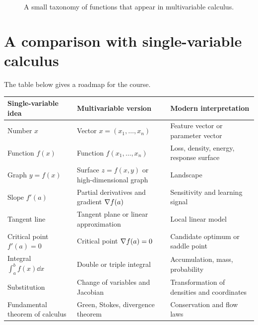 \begin{figure}[H]
\centering
{}
\caption{A small taxonomy of functions that appear in multivariable calculus.}
\label{fig:function-taxonomy}
\end{figure}

\section{A comparison with single-variable calculus}

The table below gives a roadmap for the course.

\begin{center}
\begin{tabularx}{\textwidth}{>{\raggedright\arraybackslash}p{} >{\raggedright\arraybackslash}p{} X}
\toprule
\textbf{Single-variable idea} & \textbf{Multivariable version} & \textbf{Modern interpretation}\\
\midrule
Number $x$ & Vector $x=(x_1,\dots,x_n)$ & Feature vector or parameter vector\\
Function $f(x)$ & Function $f(x_1,\dots,x_n)$ & Loss, density, energy, response surface\\
Graph $y=f(x)$ & Surface $z=f(x,y)$ or high-dimensional graph & Landscape\\
Slope $f'(a)$ & Partial derivatives and gradient $\nabla f(a)$ & Sensitivity and learning signal\\
Tangent line & Tangent plane or linear approximation & Local linear model\\
Critical point $f'(a)=0$ & Critical point $\nabla f(a)=0$ & Candidate optimum or saddle point\\
Integral $\int_a^b f(x)\dd x$ & Double or triple integral & Accumulation, mass, probability\\
Substitution & Change of variables and Jacobian & Transformation of densities and coordinates\\
Fundamental theorem of calculus & Green, Stokes, divergence theorem & Conservation and flow laws\\
\bottomrule
\end{tabularx}
\end{center}

